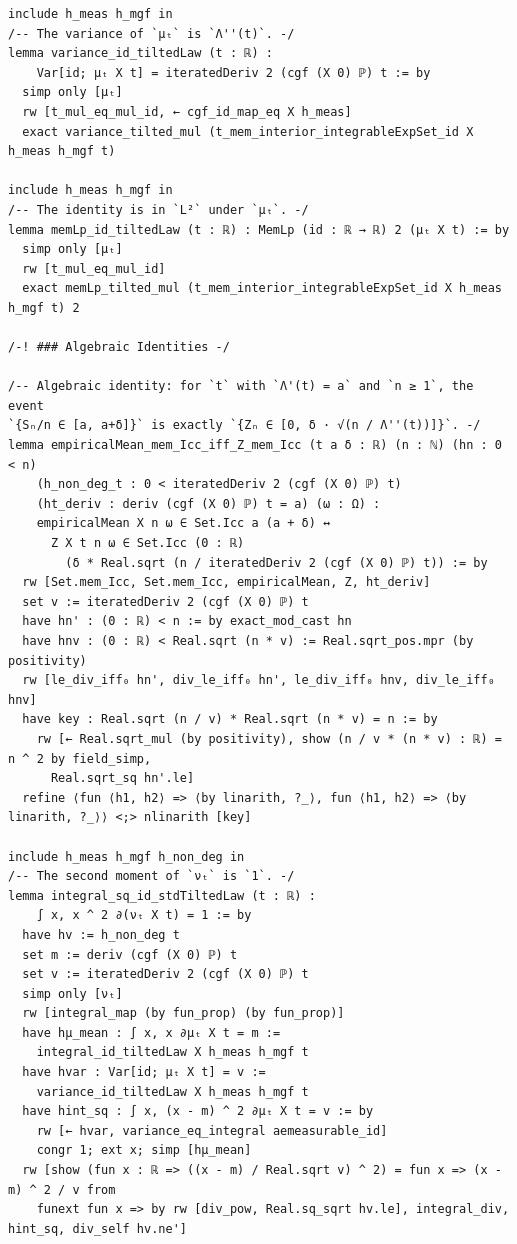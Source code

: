 \newpage
\begin{lstlisting}
include h_meas h_mgf in
/-- The variance of `μₜ` is `Λ''(t)`. -/
lemma variance_id_tiltedLaw (t : ℝ) :
    Var[id; μₜ X t] = iteratedDeriv 2 (cgf (X 0) ℙ) t := by
  simp only [μₜ]
  rw [t_mul_eq_mul_id, ← cgf_id_map_eq X h_meas]
  exact variance_tilted_mul (t_mem_interior_integrableExpSet_id X h_meas h_mgf t)

include h_meas h_mgf in
/-- The identity is in `L²` under `μₜ`. -/
lemma memLp_id_tiltedLaw (t : ℝ) : MemLp (id : ℝ → ℝ) 2 (μₜ X t) := by
  simp only [μₜ]
  rw [t_mul_eq_mul_id]
  exact memLp_tilted_mul (t_mem_interior_integrableExpSet_id X h_meas h_mgf t) 2

/-! ### Algebraic Identities -/

/-- Algebraic identity: for `t` with `Λ'(t) = a` and `n ≥ 1`, the event
`{Sₙ/n ∈ [a, a+δ]}` is exactly `{Zₙ ∈ [0, δ · √(n / Λ''(t))]}`. -/
lemma empiricalMean_mem_Icc_iff_Z_mem_Icc (t a δ : ℝ) (n : ℕ) (hn : 0 < n)
    (h_non_deg_t : 0 < iteratedDeriv 2 (cgf (X 0) ℙ) t)
    (ht_deriv : deriv (cgf (X 0) ℙ) t = a) (ω : Ω) :
    empiricalMean X n ω ∈ Set.Icc a (a + δ) ↔
      Z X t n ω ∈ Set.Icc (0 : ℝ)
        (δ * Real.sqrt (n / iteratedDeriv 2 (cgf (X 0) ℙ) t)) := by
  rw [Set.mem_Icc, Set.mem_Icc, empiricalMean, Z, ht_deriv]
  set v := iteratedDeriv 2 (cgf (X 0) ℙ) t
  have hn' : (0 : ℝ) < n := by exact_mod_cast hn
  have hnv : (0 : ℝ) < Real.sqrt (n * v) := Real.sqrt_pos.mpr (by positivity)
  rw [le_div_iff₀ hn', div_le_iff₀ hn', le_div_iff₀ hnv, div_le_iff₀ hnv]
  have key : Real.sqrt (n / v) * Real.sqrt (n * v) = n := by
    rw [← Real.sqrt_mul (by positivity), show (n / v * (n * v) : ℝ) = n ^ 2 by field_simp,
      Real.sqrt_sq hn'.le]
  refine ⟨fun ⟨h1, h2⟩ => ⟨by linarith, ?_⟩, fun ⟨h1, h2⟩ => ⟨by linarith, ?_⟩⟩ <;> nlinarith [key]

include h_meas h_mgf h_non_deg in
/-- The second moment of `νₜ` is `1`. -/
lemma integral_sq_id_stdTiltedLaw (t : ℝ) :
    ∫ x, x ^ 2 ∂(νₜ X t) = 1 := by
  have hv := h_non_deg t
  set m := deriv (cgf (X 0) ℙ) t
  set v := iteratedDeriv 2 (cgf (X 0) ℙ) t
  simp only [νₜ]
  rw [integral_map (by fun_prop) (by fun_prop)]
  have hμ_mean : ∫ x, x ∂μₜ X t = m :=
    integral_id_tiltedLaw X h_meas h_mgf t
  have hvar : Var[id; μₜ X t] = v :=
    variance_id_tiltedLaw X h_meas h_mgf t
  have hint_sq : ∫ x, (x - m) ^ 2 ∂μₜ X t = v := by
    rw [← hvar, variance_eq_integral aemeasurable_id]
    congr 1; ext x; simp [hμ_mean]
  rw [show (fun x : ℝ => ((x - m) / Real.sqrt v) ^ 2) = fun x => (x - m) ^ 2 / v from
    funext fun x => by rw [div_pow, Real.sq_sqrt hv.le], integral_div, hint_sq, div_self hv.ne']

\end{lstlisting}
